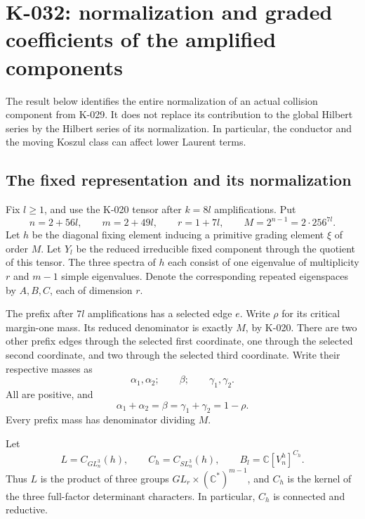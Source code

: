 \section{K-032: normalization and graded coefficients of the amplified components}

The result below identifies the entire normalization of an actual collision
component from K-029.  It does not replace its contribution to the global
Hilbert series by the Hilbert series of its normalization.  In particular,
the conductor and the moving Koszul class can affect lower Laurent terms.

\subsection*{The fixed representation and its normalization}

Fix $l\ge1$, and use the K-020 tensor after $k=8l$ amplifications.  Put
\[
 n=2+56l,\qquad m=2+49l,\qquad r=1+7l,\qquad
 M=2^{n-1}=2\cdot256^{7l}.
                                                        \tag{K-032a}
\]
Let $h$ be the diagonal fixing element inducing a primitive grading
element $\xi$ of order $M$.  Let $Y_l$ be the reduced irreducible fixed
component through the quotient of this tensor.  The three spectra of
$h$ each consist of one eigenvalue of multiplicity $r$ and $m-1$ simple
eigenvalues.  Denote the corresponding repeated eigenspaces by
$A,B,C$, each of dimension $r$.

The prefix after $7l$ amplifications has a selected edge $e$.  Write
$\rho$ for its critical margin-one mass.  Its reduced denominator is
exactly $M$, by K-020.  There are two other prefix edges through the
selected first coordinate, one through the selected second coordinate,
and two through the selected third coordinate.  Write their respective
masses as
\[
 \alpha_1,\alpha_2;\qquad \beta;\qquad \gamma_1,\gamma_2.
\]
All are positive, and
\[
 \alpha_1+\alpha_2=\beta=\gamma_1+\gamma_2=1-\rho.
                                                        \tag{K-032b}
\]
Every prefix mass has denominator dividing $M$.

Let
\[
 L=C_{GL_n^3}(h),\qquad C_h=C_{SL_n^3}(h),\qquad
 B_l=\mathbb C[V_n^h]^{C_h}.
\]
Thus $L$ is the product of three groups
$GL_r\times(\mathbb C^*)^{m-1}$, and $C_h$ is the kernel of the
three full-factor determinant characters.  In particular, $C_h$ is
connected and reductive.


